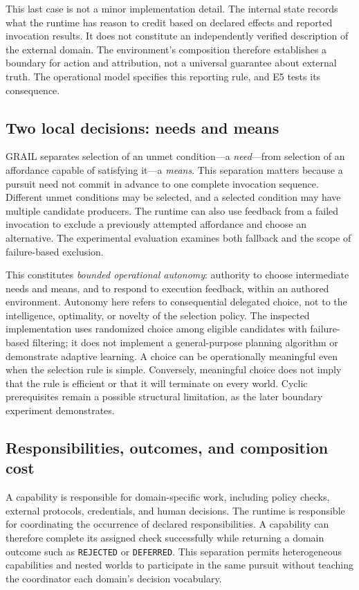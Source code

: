 \documentclass[11pt]{article}
\begin{document}
This last case is not a minor implementation detail. The internal state records what the runtime has reason to credit based on declared effects and reported invocation results. It does not constitute an independently verified description of the external domain. The environment's composition therefore establishes a boundary for action and attribution, not a universal guarantee about external truth. The operational model specifies this reporting rule, and E5 tests its consequence.

\subsection{Two local decisions: needs and means}
GRAIL separates selection of an unmet condition---a \emph{need}---from selection of an affordance capable of satisfying it---a \emph{means}. This separation matters because a pursuit need not commit in advance to one complete invocation sequence. Different unmet conditions may be selected, and a selected condition may have multiple candidate producers. The runtime can also use feedback from a failed invocation to exclude a previously attempted affordance and choose an alternative. The experimental evaluation examines both fallback and the scope of failure-based exclusion.

This constitutes \emph{bounded operational autonomy}: authority to choose intermediate needs and means, and to respond to execution feedback, within an authored environment. Autonomy here refers to consequential delegated choice, not to the intelligence, optimality, or novelty of the selection policy. The inspected implementation uses randomized choice among eligible candidates with failure-based filtering; it does not implement a general-purpose planning algorithm or demonstrate adaptive learning. A choice can be operationally meaningful even when the selection rule is simple. Conversely, meaningful choice does not imply that the rule is efficient or that it will terminate on every world. Cyclic prerequisites remain a possible structural limitation, as the later boundary experiment demonstrates.

\subsection{Responsibilities, outcomes, and composition cost}
A capability is responsible for domain-specific work, including policy checks, external protocols, credentials, and human decisions. The runtime is responsible for coordinating the occurrence of declared responsibilities. A capability can therefore complete its assigned check successfully while returning a domain outcome such as \texttt{REJECTED} or \texttt{DEFERRED}. This separation permits heterogeneous capabilities and nested worlds to participate in the same pursuit without teaching the coordinator each domain's decision vocabulary.
\end{document}
